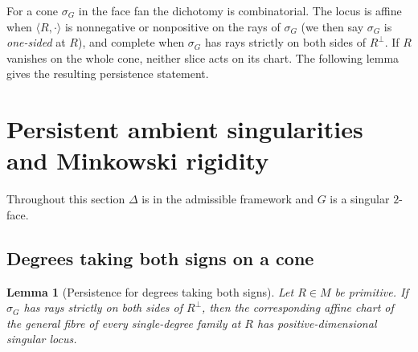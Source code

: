 \documentclass[11pt]{amsart}
\newtheorem{lemma}[theorem]{Lemma}
\theoremstyle{definition}
\theoremstyle{remark}
\theoremstyle{plain}
\begin{document}
For a cone $\sigma_G$ in the face fan the dichotomy is combinatorial.  The
locus is affine when $\langle R, \cdot\rangle$ is nonnegative or nonpositive
on the rays of $\sigma_G$ (we then say $\sigma_G$ is \emph{one-sided} at
$R$), and complete when $\sigma_G$ has rays strictly on both sides of
$R^\perp$.  If $R$ vanishes on the whole cone, neither slice acts on its
chart.  The following lemma gives the resulting persistence statement.

\section{Persistent ambient singularities and Minkowski rigidity}\label{sec:obstructions}

Throughout this section $\Delta$ is in the admissible framework and $G$ is a
singular $2$-face.

\subsection{Degrees taking both signs on a cone}

\begin{lemma}[Persistence for degrees taking both signs]\label{lem:reach}
Let $R \in M$ be primitive.  If $\sigma_G$ has rays strictly on both sides of
$R^{\perp}$, then the corresponding affine chart of the general fibre of every
single-degree family at $R$ has positive-dimensional singular locus.
\end{lemma}
\end{document}
